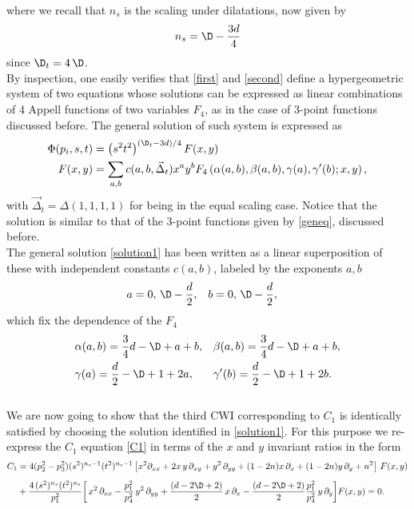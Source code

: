 \documentclass[a4paper,11pt,openright,twoside]{book}
\let\a=\alpha   \let\b=\beta   \let\g=\gamma   \let\d=\delta
\numberwithin{equation}{section}
\begin{document}
{\begin{align}
\end{align}
where we recall that $n_s$ is the scaling under dilatations, now given by
\begin{equation}
	\label{scaled}
	n_s=\D-\frac{3d}{4}
\end{equation}
since $\D_t=4\, \D$. \\
By inspection, one easily verifies that \eqref{first} and \eqref{second} define a hypergeometric system of two equations whose solutions can be expressed as linear combinations of 4 Appell functions of two variables $F_4$, as in the case of 3-point functions discussed before. The general solution of such system is expressed as
\begin{align}
	\Phi(p_i,s,t) &=\big(s^2t^2\big)^{(\D_t-3d)/4}\, F(x,y) \notag\\
	F(x,y)&= \sum_{a,b} c(a,b,\vec\Delta_t) x^a y^b F_4\left(\a(a,b),\b(a,b),\gamma(a),\g'(b);x, y\right),\label{solution1}
\end{align}
with $\vec\Delta_t=\Delta(1,1,1,1)$ for being in the equal scaling case.  Notice that the solution is similar to that of the 3-point functions given by \eqref{geneq}, discussed before.\\
The general solution \eqref{solution1} has been written as a linear superposition of these with independent constants $c(a,b)$, labeled by the exponents $a,b$ 
\begin{align}
	&a=0,\,\D-\frac{d}{2},&&b=0,\,\D-\frac{d}{2},\label{FuchsianPoint}
\end{align}
which fix the dependence of the $F_4$  
\begin{align}
	\label{s2}
	&\a(a,b)=\frac{3}{4}d-\D+a+b,&&\b(a,b)=\frac{3}{4}d-\D+a+b,\notag\\
	&\gamma(a)=\frac{d}{2}-\D+1+2a,&&\g'(b)=\frac{d}{2}-\D+1+2b.
\end{align}\\
We are now going to show that the third CWI corresponding to $C_1$ is identically satisfied by choosing the solution identified in \eqref{solution1}. For this purpose we re-express the $C_1$ equation \eqref{C1} in terms of the $x$ and $y$ invariant ratios in the form 
\begin{equation}
	\begin{aligned}
		C_1&=4(p_2^2-p_3^2)(s^2)^{n_s-1}(t^2)^{n_s-1}\left[x^2 \partial_{xx} +2x\,y\,\partial_{xy}+y^2\,\partial_{yy}+(1-2n)x\,\partial_x+(1-2n)y\,\partial_y+n^2\right]\,F(x,y) \\[1.3ex]
		&+\frac{4\,(s^2)^{n_s}(t^2)^{n_s}}{p_1^2}\bigg[\,x^2\,\partial_{xx}-\frac{p_1^2}{p_4^2}\,y^2\,\partial_{yy}+\frac{(d-2\D+2)}{2}\,x\,\partial_x -\frac{(d-2\D+2)}{2}\frac{p_1^2}{p_4^2}\,y\,\partial_y \bigg]F(x,y) = 0.\label{C1mod}

\end{aligned}
\end{equation}}
\end{document}
